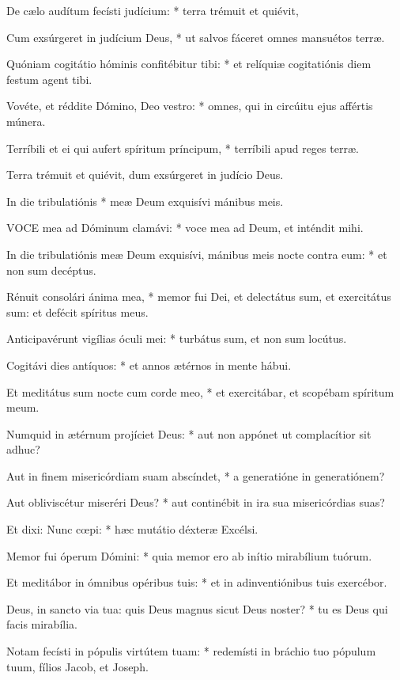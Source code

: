 De cælo audítum fecísti judícium: * terra trémuit et quiévit,

Cum exsúrgeret in judícium Deus, * ut salvos fáceret omnes mansuétos terræ.

Quóniam cogitátio hóminis confitébitur tibi: * et relíquiæ cogitatiónis diem festum agent tibi.

Vovéte, et réddite Dómino, Deo vestro: * omnes, qui in circúitu ejus affértis múnera.

Terríbili et ei qui aufert spíritum príncipum, * terríbili apud reges terræ.

\rubric{\textdagger}

 Terra trémuit et quiévit, dum exsúrgeret in judício Deus.

 In die tribulatiónis * meæ Deum exquisívi mánibus meis.


\lettrine[lines=2]{V}{OCE} mea ad Dóminum clamávi: * voce mea ad Deum, et inténdit mihi.

In die tribulatiónis meæ Deum exquisívi, mánibus meis nocte contra eum: * et non sum decéptus.

Rénuit consolári ánima mea, * memor fui Dei, et delectátus sum, et exercitátus sum: et defécit spíritus meus.

Anticipavérunt vigílias óculi mei: * turbátus sum, et non sum locútus.

Cogitávi dies antíquos: * et annos ætérnos in mente hábui.

Et meditátus sum nocte cum corde meo, * et exercitábar, et scopébam spíritum meum.

Numquid in ætérnum projíciet Deus: * aut non appónet ut complacítior sit adhuc?

Aut in finem misericórdiam suam abscíndet, * a generatióne in generatiónem?

Aut obliviscétur miseréri Deus? * aut continébit in ira sua misericórdias suas?

Et dixi: Nunc cœpi: * hæc mutátio déxteræ Excélsi.

Memor fui óperum Dómini: * quia memor ero ab inítio mirabílium tuórum.

Et meditábor in ómnibus opéribus tuis: * et in adinventiónibus tuis exercébor.

Deus, in sancto via tua: quis Deus magnus sicut Deus noster? * tu es Deus qui facis mirabília.

Notam fecísti in pópulis virtútem tuam: * redemísti in bráchio tuo pópulum tuum, fílios Jacob, et Joseph.

